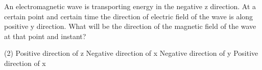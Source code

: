 \item An electromagnetic wave is transporting energy in the negative z direction. At a certain point and certain time the direction of electric field of the wave is along positive y direction. What will be the direction of the magnetic field of the wave at that point and instant?
    \begin{tasks}(2)
        \task Positive direction of z
        \task Negative direction of x
        \task Negative direction of y
        \task Positive direction of x
    \end{tasks}